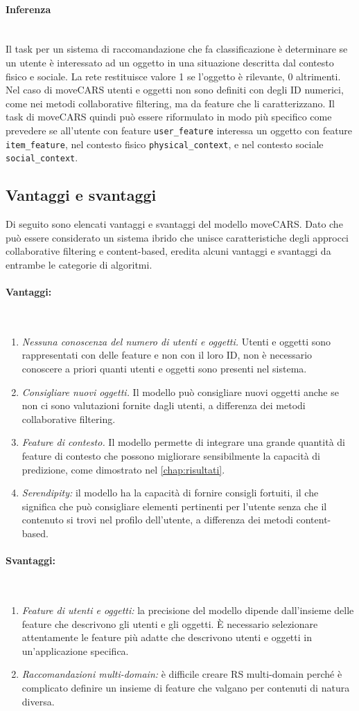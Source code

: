 \documentclass[12pt,italian]{report}
\newcommand{\myparagraph}[1]{\paragraph{#1}\mbox{}\\}
\begin{document}
\myparagraph{Inferenza}
Il task per un sistema di raccomandazione che fa classificazione è determinare se un utente è interessato ad un oggetto in una situazione descritta dal contesto fisico e sociale. La rete restituisce valore 1 se l'oggetto è rilevante, 0 altrimenti. Nel caso di moveCARS utenti e oggetti non sono definiti con degli ID numerici, come nei metodi collaborative filtering, ma da feature che li caratterizzano. Il task di moveCARS quindi può essere riformulato in modo più specifico come prevedere se all'utente con feature \texttt{user\_feature} interessa un oggetto con feature \texttt{item\_feature}, nel contesto fisico \texttt{physical\_context}, e nel contesto sociale \texttt{social\_context}.

\subsection{Vantaggi e svantaggi}
Di seguito sono elencati vantaggi e svantaggi del modello moveCARS. Dato che può essere considerato un sistema ibrido che unisce caratteristiche degli approcci collaborative filtering e content-based, eredita alcuni vantaggi e svantaggi da entrambe le categorie di algoritmi.

\myparagraph{Vantaggi:}
\begin{enumerate}
 \item \textit{Nessuna conoscenza del numero di utenti e oggetti.} Utenti e oggetti sono rappresentati con delle feature e non con il loro ID, non è necessario conoscere a priori quanti utenti e oggetti sono presenti nel sistema.
 \item \textit{Consigliare nuovi oggetti.} Il modello può consigliare nuovi oggetti anche se non ci sono valutazioni fornite dagli utenti, a differenza dei metodi collaborative filtering.
 \item \textit{Feature di contesto.} Il modello permette di integrare una grande quantità di feature di contesto che possono migliorare sensibilmente la capacità di predizione, come dimostrato nel \autoref{chap:risultati}.
 \item \textit{Serendipity:} il modello ha la capacità di fornire consigli fortuiti, il che significa che può consigliare elementi pertinenti per l'utente senza che il contenuto si trovi nel profilo dell'utente, a differenza dei metodi content-based.
\end{enumerate}

\myparagraph{Svantaggi:}
\begin{enumerate}
 \item \textit{Feature di utenti e oggetti:} la precisione del modello dipende dall'insieme delle feature che descrivono gli utenti e gli oggetti. \`E necessario selezionare attentamente le feature più adatte che descrivono utenti e oggetti in un'applicazione specifica.
  
 \item \textit{Raccomandazioni multi-domain:} è difficile creare RS multi-domain perché è complicato definire un insieme di feature che valgano per contenuti di natura diversa.
\end{enumerate}
\end{document}
